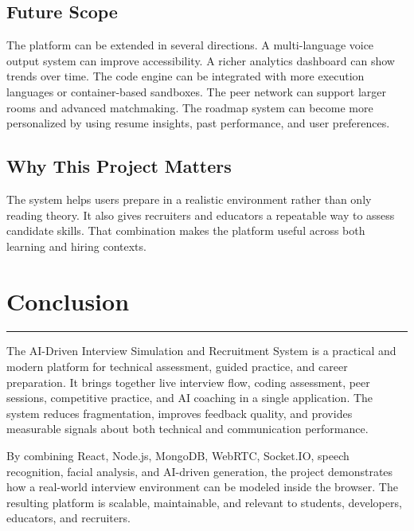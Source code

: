 ﻿\documentclass[12pt,a4paper]{article}
\newcommand{\sectionline}{\vspace{0.4em}\hrule\vspace{0.8em}}
\begin{document}
\subsection{Future Scope}
The platform can be extended in several directions. A multi-language voice output system can improve accessibility. A richer analytics dashboard can show trends over time. The code engine can be integrated with more execution languages or container-based sandboxes. The peer network can support larger rooms and advanced matchmaking. The roadmap system can become more personalized by using resume insights, past performance, and user preferences.

\subsection{Why This Project Matters}
The system helps users prepare in a realistic environment rather than only reading theory. It also gives recruiters and educators a repeatable way to assess candidate skills. That combination makes the platform useful across both learning and hiring contexts.

\clearpage

\section{Conclusion}
\sectionline
The AI-Driven Interview Simulation and Recruitment System is a practical and modern platform for technical assessment, guided practice, and career preparation. It brings together live interview flow, coding assessment, peer sessions, competitive practice, and AI coaching in a single application. The system reduces fragmentation, improves feedback quality, and provides measurable signals about both technical and communication performance.

By combining React, Node.js, MongoDB, WebRTC, Socket.IO, speech recognition, facial analysis, and AI-driven generation, the project demonstrates how a real-world interview environment can be modeled inside the browser. The resulting platform is scalable, maintainable, and relevant to students, developers, educators, and recruiters.

\clearpage
\end{document}
